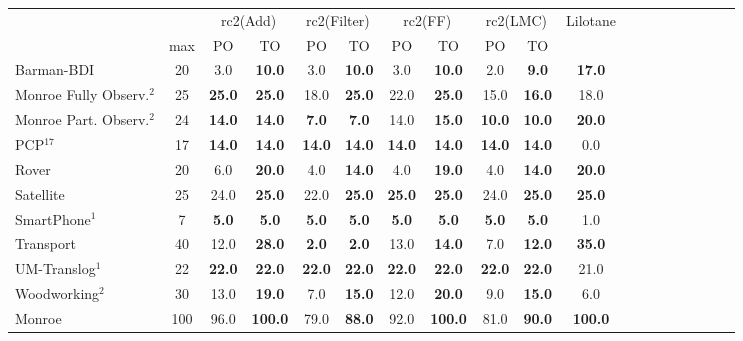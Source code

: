 \begin{tabular}{lccccccccccccccccccl} 
\toprule 
  && \multicolumn{2}{c}{rc2(Add)} & \multicolumn{2}{c}{rc2(Filter)} & \multicolumn{2}{c}{rc2(FF)} & \multicolumn{2}{c}{rc2(LMC)} & \multicolumn{2}{c}{Lilotane} \\ 
\cmidrule(lr){3-4} \cmidrule(lr){5-6} \cmidrule(lr){7-8} \cmidrule(lr){9-10} \cmidrule(lr){11-12}  
 & max &PO & TO & PO & TO & PO & TO & PO &\multicolumn{2}{c}{ TO  } \\ 
\midrule 
Barman-BDI & 20 & 3.0 & \textbf{10.0} & 3.0 & \textbf{10.0} & 3.0 & \textbf{10.0} & 2.0 & \textbf{9.0} &\multicolumn{2}{c}{ \textbf{17.0}  } \\ 
 Monroe Fully Observ.$^{2}$ & 25 & \textbf{25.0} & \textbf{25.0} & 18.0 & \textbf{25.0} & 22.0 & \textbf{25.0} & 15.0 & \textbf{16.0} &\multicolumn{2}{c}{ 18.0  } \\ 
 Monroe Part. Observ.$^{2}$ & 24 & \textbf{14.0} & \textbf{14.0} & \textbf{7.0} & \textbf{7.0} & 14.0 & \textbf{15.0} & \textbf{10.0} & \textbf{10.0} &\multicolumn{2}{c}{ \textbf{20.0}  } \\ 
PCP$^{17}$ & 17 & \textbf{14.0} & \textbf{14.0} & \textbf{14.0} & \textbf{14.0} & \textbf{14.0} & \textbf{14.0} & \textbf{14.0} & \textbf{14.0} &\multicolumn{2}{c}{ 0.0  } \\ 
Rover & 20 & 6.0 & \textbf{20.0} & 4.0 & \textbf{14.0} & 4.0 & \textbf{19.0} & 4.0 & \textbf{14.0} &\multicolumn{2}{c}{ \textbf{20.0}  } \\ 
Satellite & 25 & 24.0 & \textbf{25.0} & 22.0 & \textbf{25.0} & \textbf{25.0} & \textbf{25.0} & 24.0 & \textbf{25.0} &\multicolumn{2}{c}{ \textbf{25.0}  } \\ 
SmartPhone$^{1}$ & 7 & \textbf{5.0} & \textbf{5.0} & \textbf{5.0} & \textbf{5.0} & \textbf{5.0} & \textbf{5.0} & \textbf{5.0} & \textbf{5.0} &\multicolumn{2}{c}{ 1.0  } \\ 
Transport & 40 & 12.0 & \textbf{28.0} & \textbf{2.0} & \textbf{2.0} & 13.0 & \textbf{14.0} & 7.0 & \textbf{12.0} &\multicolumn{2}{c}{ \textbf{35.0}  } \\ 
UM-Translog$^{1}$ & 22 & \textbf{22.0} & \textbf{22.0} & \textbf{22.0} & \textbf{22.0} & \textbf{22.0} & \textbf{22.0} & \textbf{22.0} & \textbf{22.0} &\multicolumn{2}{c}{ 21.0  } \\ 
Woodworking$^{2}$ & 30 & 13.0 & \textbf{19.0} & 7.0 & \textbf{15.0} & 12.0 & \textbf{20.0} & 9.0 & \textbf{15.0} &\multicolumn{2}{c}{ 6.0  } \\ 
\midrule 
 Monroe & 100 & 96.0 & \textbf{100.0} & 79.0 & \textbf{88.0} & 92.0 & \textbf{100.0} & 81.0 & \textbf{90.0} &\multicolumn{2}{c}{ \textbf{100.0}  } \\ 

\end{tabular}
